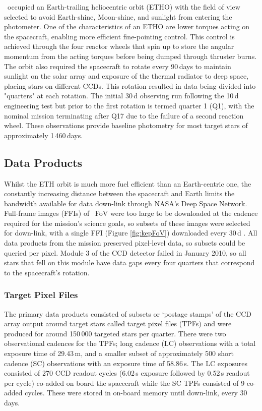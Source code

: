 \Kepler~occupied an Earth-trailing heliocentric orbit (ETHO) with the field of view selected to avoid Earth-shine, Moon-shine, and sunlight from entering the photometer. One of the characteristics of an ETHO are lower torques acting on the spacecraft, enabling more efficient fine-pointing control. This control is achieved through the four reactor wheels that spin up to store the angular momentum from the acting torques before being dumped through thruster burns. The orbit also required the spacecraft to rotate every 90\,days to maintain sunlight on the solar array and exposure of the thermal radiator to deep space, placing stars on different CCDs. This rotation resulted in data being divided into "quarters" at each rotation. The initial 30\,d observing run following the 10\,d engineering test but prior to the first rotation is termed quarter 1 (Q1), with the nominal mission terminating after Q17 due to the failure of a second reaction wheel. These observations provide baseline photometry for most target stars of approximately 1\,460\,days.

\subsection{Data Products}

Whilst the ETH orbit is much more fuel efficient than an Earth-centric one, the constantly increasing distance between the spacecraft and Earth limits the bandwidth available for data down-link through NASA's Deep Space Network. Full-frame images (FFIs) of \Keplers~FoV were too large to be downloaded at the cadence required for the mission's science goals, so subsets of these images were selected for down-link, with a single FFI (Figure \ref{fig:kepFoV}) downloaded every 30\,d \citep{thompson_kepler_2016}. All data products from the mission preserved pixel-level data, so subsets could be queried per pixel. Module 3 of the CCD detector failed in January 2010, so all stars that fell on this module have data gaps every four quarters that correspond to the spacecraft's rotation.

\subsubsection{Target Pixel Files}
The primary data products consisted of subsets or `postage stamps' of the CCD array output around target stars called target pixel files (TPFs) and were produced for around 150\,000 targeted stars per quarter. There were two observational cadences for the TPFs; long cadence (LC) observations with a total exposure time of 29.43\,m, and a smaller subset of approximately 500 short cadence (SC) observations with an exposure time of 58.86\,s. The LC exposures consisted of 270 CCD readout cycles (6.02\,s exposure followed by 0.52\,s readout per cycle) co-added on board the spacecraft while the SC TPFs consisted of 9 co-added cycles. These were stored in on-board memory until down-link, every 30\,days.

